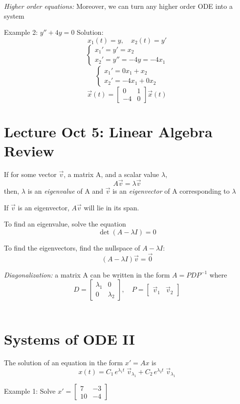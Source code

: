 \documentclass[12pt]{article}
\begin{document}
\emph{Higher order equations:} Moreover, we can turn any higher order ODE into a system 

Example 2: $y'' + 4y = 0$
Solution:
\[x_1(t) = y, \quad x_2(t) = y'\]
\[\begin{cases}
    x_1' = y' = x_2\\
    x_2' = y'' = -4y = -4x_1
\end{cases}\]
\[\begin{cases}
    x_1' = 0x_1 + x_2\\
    x_2' = -4x_1 + 0x_2
\end{cases}\]
\[\vec{x}(t) = \begin{bmatrix}
    0 & 1\\
    -4 & 0
\end{bmatrix} \vec{x}(t)\]

\section{Lecture Oct 5: Linear Algebra Review}
If for some vector $\vec{v}$, a matrix A, and a scalar value $\lambda$, 
\[A\vec{v} = \lambda\vec{v}\]
then,
$\lambda$ is an \emph{eigenvalue} of A and $\vec{v}$ is an \emph{eigenvector} of A corresponding to $\lambda$

If $\vec{v}$ is an eigenvector, $A\vec{v}$ will lie in its span. 

To find an eigenvalue, solve the equation
\[\det (A - \lambda I) = 0\]

To find the eigenvectors, find the nullspace of $A - \lambda I$: 
\[(A - \lambda I)\vec{v} = \vec{0}\]

\emph{Diagonalization:} a matrix A can be written in the form $A = PDP^{-1}$ where
\[D = \begin{bmatrix}
    \lambda_1 & 0\\
    0 & \lambda_2
\end{bmatrix}, \quad P = \begin{bmatrix}
    \vec{v}_1 & \vec{v}_2
\end{bmatrix}\]\

\section{Systems of ODE II}
The solution of an equation in the form $x' = Ax$ is 
\[x(t) = C_1 \, e^{\lambda_1 t}\; \vec{v}_{\lambda_1} + C_2 \, e^{\lambda_2 t}\; \vec{v}_{\lambda_1}\]

Example 1: Solve $x' = \begin{bmatrix}
    7 & -3\\
    10 & -4
\end{bmatrix}$
\end{document}
